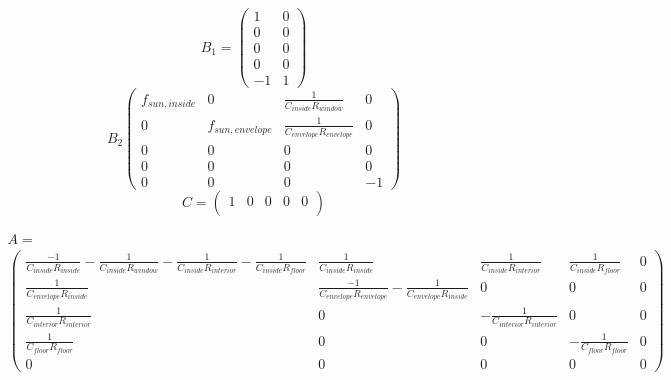    \begin{equation}
    B_1 = 
    \begin{pmatrix}
        1 & 0 \\
        0 & 0 \\
        0 & 0 \\
        0 & 0 \\
        -1 & 1 
    \end{pmatrix}
    \end{equation}
    \begin{equation}
	B_2
	\begin{pmatrix}
         f_{sun,inside} & 0 & \frac{1}{C_{inside}R_{window}} & 0\\
         0 & f_{sun,envelope} & \frac{1}{C_{envelope}R_{envelope}}&0\\
         0 & 0 & 0& 0\\
         0 & 0 & 0& 0\\
         0 & 0 & 0 & -1
    \end{pmatrix}
	\end{equation}
	\begin{equation}
	    C = 
	    \begin{pmatrix}
        1 & 0 & 0 & 0 & 0 \\
        \end{pmatrix}
	\end{equation}
	\begin{landscape}
	\begin{align} 
	A = \nonumber \\ 
	\begin{pmatrix}
    \frac{-1}{C_{inside}R_{inside}}-\frac{1}{C_{inside}R_{window}}-\frac{1}{C_{inside}R_{interior}}-\frac{1}{C_{inside}R_{floor}}   & \frac{1}{C_{inside}R_{inside}} & \frac{1}{C_{inside}R_{interior}} & \frac{1}{C_{inside}R_{floor}} & 0 \\
    \frac{1}{C_{envelope}R_{inside}}& \frac{-1}{C_{envelope}R_{envelope}}- \frac{1}{C_{envelope}R_{inside}} & 0 & 0 & 0 \\
    \frac{1}{C_{interior}R_{interior}} & 0 & -\frac{1}{C_{interior}R_{interior}} & 0 &0 \\
    \frac{1}{C_{floor}R_{floor}} & 0 & 0 & -\frac{1}{C_{floor}R_{floor}} &0 \\
    0 & 0 & 0 & 0 & 0
    \end{pmatrix} \nonumber\\ 
    \end{align}
    \end{landscape}

